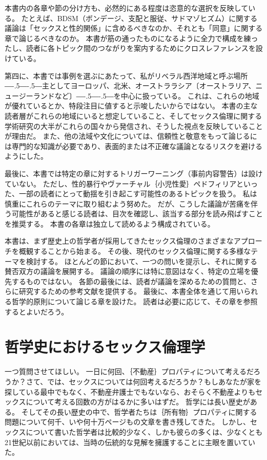 \documentclass[paper=a4,book,openany]{jlreq}
\def\DDASH{―\kern-.5\zw―\kern-.5\zw―} %
\begin{document}
本書内の各章や節の分け方も、必然的にある程度は恣意的な選択を反映している。
たとえば、BDSM（ボンデージ、支配と服従、サドマゾヒズム）に関する議論は「セックスと性的関係」に含めるべきなのか、それとも「同意」に関する章で論じるべきなのか。
本書が筋の通ったものになるように全力で構成を練ったし、読者に各トピック間のつながりを案内するためにクロスレファレンスを設けている。

第四に、本書では事例を選ぶにあたって、私がリベラル西洋地域と呼ぶ場所{\DDASH}主としてヨーロッパ、北米、オーストララシア〔オーストラリア、ニュージーランドなど〕{\DDASH}を中心に扱っている。
これは、これらの地域が優れているとか、特段注目に値すると示唆したいからではない。
本書の主な読者層がこれらの地域にいると想定していること、そしてセックス倫理に関する学術研究の大半がこれらの国々から発信され、そうした視点を反映していることが理由だ。
また、他の法域や文化については、信頼性と敬意をもって論じるには専門的な知識が必要であり、表面的または不正確な議論となるリスクを避けるようにした。

最後に、本書では特定の章に対するトリガーワーニング（事前内容警告）は設けていない。
ただし、性的暴行やヴァーチャル｛小児性愛｝{ペドフィリア}といった、一部の読者にとって動揺を引き起こす可能性のあるトピックを扱う。
私は慎重にこれらのテーマに取り組むよう努めた。
だが、こうした議論が苦痛を伴う可能性があると感じる読者は、目次を確認し、該当する部分を読み飛ばすことを推奨する。
本書の各章は独立して読めるよう構成されている。

本書は、まず歴史上の哲学者が採用してきたセックス倫理のさまざまなアプローチを概観することから始まる。
その後、現代のセックス倫理に関する多様なテーマを検討する。
ほとんどの節において、一つの問いを提示し、それに関する賛否双方の議論を展開する。
議論の順序には特に意図はなく、特定の立場を優先するものではない。
各節の最後には、読者が議論を深めるための質問と、さらに研究するための参考文献を提供する。
最後に、本書全体を通じて用いられる哲学的原則について論じる章を設けた。
読者は必要に応じて、その章を参照するとよいだろう。

\chapter{哲学史におけるセックス倫理学}

一つ質問させてほしい。
一日に何回、｛不動産｝{プロパティ}について考えるだろうか？さて、では、セックスについては何回考えるだろうか？もしあなたが家を探している最中でもなく、不動産弁護士でもないなら、おそらく不動産よりもセックスについて考える回数の方がはるかに多いはずだ。
哲学には長い歴史がある。
そしてその長い歴史の中で、哲学者たちは｛所有物｝{プロパティ}に関する問題について何千、いや何十万ページもの文章を書き残してきた。
しかし、セックスについて書いた哲学者は比較的少なく、しかも彼らの多くは、少なくとも21世紀以前においては、当時の伝統的な見解を擁護することに主眼を置いていた。
\end{document}
